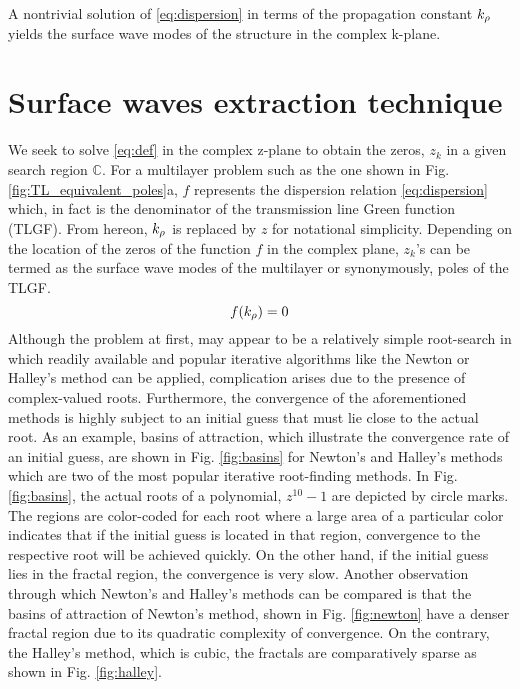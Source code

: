 A nontrivial solution of \eqref{eq:dispersion} in terms of the propagation constant $k_{\rho}$ yields the surface wave modes of the structure in the complex k-plane.
\section{Surface waves extraction technique}
%
We seek to solve \eqref{eq:def} in the complex z-plane to obtain the zeros, $z_k$ in a given search region $\mathbb{C}$. For a multilayer problem such as the one shown in Fig. \ref{fig:TL_equivalent_poles}a, $f$ represents the dispersion relation \eqref{eq:dispersion} which, in fact is the denominator of the  transmission line Green function (TLGF). From hereon, $k_{\rho}$ is replaced by $z$ for notational simplicity. Depending on the location of the zeros of the function $f$ in the complex plane, $z_k$'s can be termed as the surface wave modes of the multilayer or synonymously, poles of the TLGF.
%
\begin{equation}
  f(k_{\rho}) = 0
  \label{eq:def}
\end{equation}
%
Although the problem at first, may appear to be a relatively simple root-search in which readily available and popular iterative algorithms like the Newton or Halley's method can be applied, complication arises due to the presence of complex-valued roots. Furthermore, the convergence of the aforementioned methods is highly subject to an initial guess that must lie close to the actual root. As an example, basins of attraction, which illustrate the convergence rate of an initial guess, are shown in Fig. \ref{fig:basins} for Newton's and Halley's methods which are two of the most popular iterative root-finding methods. In Fig. \ref{fig:basins}, the actual roots of a polynomial, $z^{10}-1$ are depicted by circle marks. The regions are color-coded for each root where a large area of a particular color indicates that if the initial guess is located in that region, convergence to the respective root will be achieved quickly. On the other hand, if the initial guess lies in the fractal region, the convergence is very slow. Another observation through which Newton's and Halley's methods can be compared is that the basins of attraction of Newton's method,
shown in Fig. \ref{fig:newton} have a denser fractal region due to its quadratic complexity of convergence. On the contrary, the Halley's method, which is cubic, the fractals are comparatively sparse as shown in Fig. \ref{fig:halley}.

